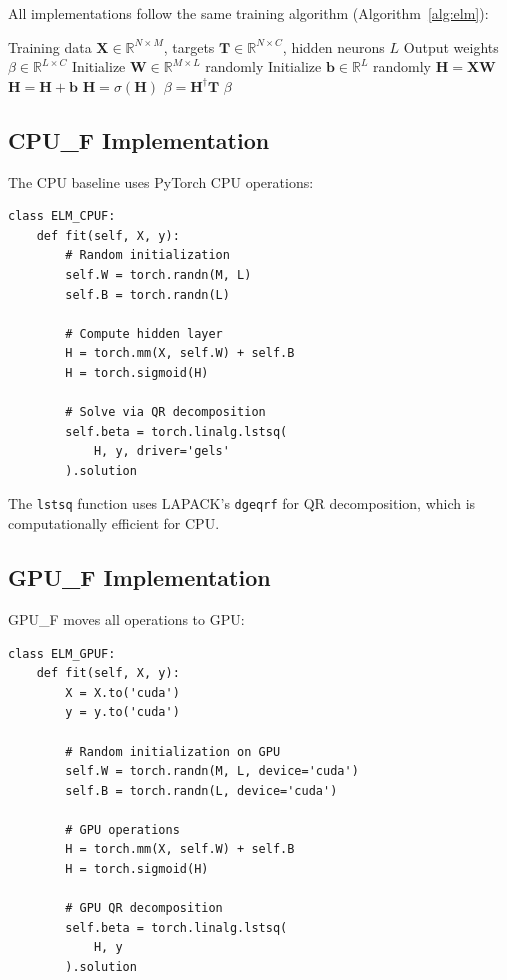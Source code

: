 \documentclass[conference]{IEEEtran}
\begin{document}
All implementations follow the same training algorithm (Algorithm~\ref{alg:elm}):

\begin{algorithm}
\caption{ELM Training Algorithm}
\label{alg:elm}
\begin{algorithmic}[1]
\REQUIRE Training data $\mathbf{X} \in \mathbb{R}^{N \times M}$, targets $\mathbf{T} \in \mathbb{R}^{N \times C}$, hidden neurons $L$
\ENSURE Output weights $\beta \in \mathbb{R}^{L \times C}$
\STATE Initialize $\mathbf{W} \in \mathbb{R}^{M \times L}$ randomly
\STATE Initialize $\mathbf{b} \in \mathbb{R}^{L}$ randomly
\STATE $\mathbf{H} = \mathbf{X}\mathbf{W}$ 
\STATE $\mathbf{H} = \mathbf{H} + \mathbf{b}$ 
\STATE $\mathbf{H} = \sigma(\mathbf{H})$ 
\STATE $\beta = \mathbf{H}^{\dagger}\mathbf{T}$ 
\RETURN $\beta$
\end{algorithmic}
\end{algorithm}

\subsection{CPU\_F Implementation}

The CPU baseline uses PyTorch CPU operations:

{\small\begin{verbatim}
class ELM_CPUF:
    def fit(self, X, y):
        # Random initialization
        self.W = torch.randn(M, L)
        self.B = torch.randn(L)
        
        # Compute hidden layer
        H = torch.mm(X, self.W) + self.B
        H = torch.sigmoid(H)
        
        # Solve via QR decomposition
        self.beta = torch.linalg.lstsq(
            H, y, driver='gels'
        ).solution
\end{verbatim}}

The \texttt{lstsq} function uses LAPACK's \texttt{dgeqrf} for QR decomposition, which is computationally efficient for CPU.

\subsection{GPU\_F Implementation}

GPU\_F moves all operations to GPU:

{\small\begin{verbatim}
class ELM_GPUF:
    def fit(self, X, y):
        X = X.to('cuda')
        y = y.to('cuda')
        
        # Random initialization on GPU
        self.W = torch.randn(M, L, device='cuda')
        self.B = torch.randn(L, device='cuda')
        
        # GPU operations
        H = torch.mm(X, self.W) + self.B
        H = torch.sigmoid(H)
        
        # GPU QR decomposition
        self.beta = torch.linalg.lstsq(
            H, y
        ).solution
\end{verbatim}}
\end{document}
